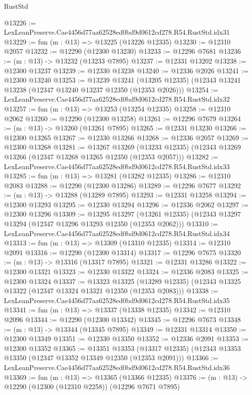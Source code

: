 \begin{lexlean}{RustStd}
\begin{coremodule}
@13226 := LexLeanPreserve.Cae4456d77aa62528ed0bd9d0612cd278.R54.RustStd.idx31
@13229 := fun (m : @13) => @13225 (@13226 @12335)
@13230 := @12310 @2057
@13232 := @12290 (@12300 @13230)
@13233 := @12296 @7681
@13236 := (m : @13) -> @13232 (@13233 @7895)
@13237 := @12331 @13202
@13238 := @12300 @13237
@13239 := @12330 @13238
@13240 := @12336 @2026
@13241 := @12300 @13240
@13253 := @13239
    @13241
    (@13205 @12335)
    (@12343 @13241 @13238 (@12347 @13240 @13237 @12350 (@12353 @2026)))
@13254 := LexLeanPreserve.Cae4456d77aa62528ed0bd9d0612cd278.R54.RustStd.idx32
@13257 := fun (m : @13) => @13253 (@13254 @12335)
@13258 := @12310 @2062
@13260 := @12290 (@12300 @13258)
@13261 := @12296 @7679
@13264 := (m : @13) -> @13260 (@13261 @7895)
@13265 := @12331 @13230
@13266 := @12300 @13265
@13267 := @12330 @13266
@13268 := @12336 @2057
@13269 := @12300 @13268
@13281 := @13267
    @13269
    (@13233 @12335)
    (@12343 @13269 @13266 (@12347 @13268 @13265 @12350 (@12353 @2057)))
@13282 := LexLeanPreserve.Cae4456d77aa62528ed0bd9d0612cd278.R54.RustStd.idx33
@13285 := fun (m : @13) => @13281 (@13282 @12335)
@13286 := @12310 @2083
@13288 := @12290 (@12300 @13286)
@13289 := @12296 @7677
@13292 := (m : @13) -> @13288 (@13289 @7895)
@13293 := @12331 @13258
@13294 := @12300 @13293
@13295 := @12330 @13294
@13296 := @12336 @2062
@13297 := @12300 @13296
@13309 := @13295
    @13297
    (@13261 @12335)
    (@12343 @13297 @13294 (@12347 @13296 @13293 @12350 (@12353 @2062)))
@13310 := LexLeanPreserve.Cae4456d77aa62528ed0bd9d0612cd278.R54.RustStd.idx34
@13313 := fun (m : @13) => @13309 (@13310 @12335)
@13314 := @12310 @2091
@13316 := @12290 (@12300 @13314)
@13317 := @12296 @7675
@13320 := (m : @13) -> @13316 (@13317 @7895)
@13321 := @12331 @13286
@13322 := @12300 @13321
@13323 := @12330 @13322
@13324 := @12336 @2083
@13325 := @12300 @13324
@13337 := @13323
    @13325
    (@13289 @12335)
    (@12343 @13325 @13322 (@12347 @13324 @13321 @12350 (@12353 @2083)))
@13338 := LexLeanPreserve.Cae4456d77aa62528ed0bd9d0612cd278.R54.RustStd.idx35
@13341 := fun (m : @13) => @13337 (@13338 @12335)
@13342 := @12310 @2096
@13344 := @12290 (@12300 @13342)
@13345 := @12296 @7673
@13348 := (m : @13) -> @13344 (@13345 @7895)
@13349 := @12331 @13314
@13350 := @12300 @13349
@13351 := @12330 @13350
@13352 := @12336 @2091
@13353 := @12300 @13352
@13365 := @13351
    @13353
    (@13317 @12335)
    (@12343 @13353 @13350 (@12347 @13352 @13349 @12350 (@12353 @2091)))
@13366 := LexLeanPreserve.Cae4456d77aa62528ed0bd9d0612cd278.R54.RustStd.idx36
@13369 := fun (m : @13) => @13365 (@13366 @12335)
@13376 := (m : @13) -> @12290 (@12300 (@12310 @2258)) (@12296 @7671 @7895)

\end{coremodule}
\end{lexlean}

